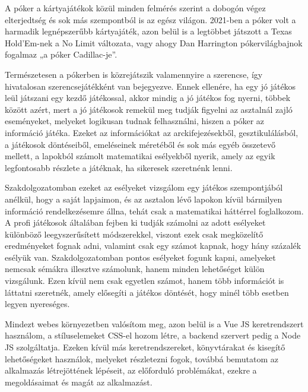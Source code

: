 
A póker a kártyajátékok közül minden felmérés szerint a dobogón végez elterjedtség és sok más szempontból is az egész világon. %
2021-ben a póker volt a harmadik legnépszerűbb kártyajáték, azon belül is a legtöbbet játszott a Texas Hold’Em-nek a No Limit változata, vagy ahogy Dan Harrington pókervilágbajnok fogalmaz „a póker Cadillac-je”. 


Természetesen a pókerben is közrejátszik valamennyire a szerencse, így hivatalosan szerencsejátékként van bejegyezve. 
Ennek ellenére, ha egy jó játékos leül játszani egy kezdő játékossal, akkor mindig a jó játékos fog nyerni, többek között azért, mert a jó játékosok remekül meg tudják figyelni az asztalnál zajló eseményeket, melyeket logikusan tudnak felhasználni, hiszen a póker az információ játéka.
Ezeket az információkat az arckifejezésekből, gesztikulálásból, a játékosok döntéseiből, emeléseinek méretéből és sok más egyéb összetevő mellett, a lapokból számolt matematikai esélyekből nyerik, amely az egyik legfontosabb részlete a játéknak, ha sikeresek szeretnénk lenni.

Szakdolgozatomban ezeket az esélyeket vizsgálom egy játékos szempontjából anélkül, hogy a saját lapjaimon, és az asztalon lévő lapokon kívül bármilyen információ rendelkezésemre állna, tehát csak a matematikai háttérrel foglalkozom. A profi játékosok általában fejben ki tudják számolni az adott esélyeket különböző leegyszerűsített módszerekkel, viszont ezek csak megközelítő eredményeket fognak adni, valamint csak egy számot kapnak, hogy hány százalék esélyük van. Szakdolgozatomban pontos esélyeket fogunk kapni, amelyeket nemcsak sémákra illesztve számolunk, hanem minden lehetőséget külön vizsgálunk. Ezen kívül nem csak egyetlen számot, hanem több információt is láttatni szeretnék, amely elősegíti a játékos döntését, hogy minél több esetben legyen nyereséges. %

Mindezt webes környezetben valósítom meg, azon belül is a Vue JS keretrendszert használom, a stíluselemeket CSS-el hozom létre, a backend szervert pedig a Node JS szolgáltatja. Ezeken kívül más keretrendszereket, könyvtárakat és kisegítő lehetőségeket használok, melyeket részletezni fogok, továbbá bemutatom az alkalmazás létrejöttének lépéseit, az előforduló problémákat, ezekre a megoldásaimat és magát az alkalmazást.
\cite{harrington}